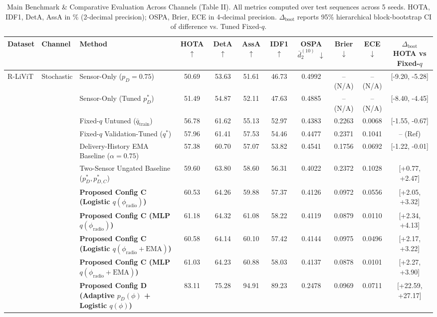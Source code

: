 \begin{table}[!t]
\caption{Main Benchmark & Comparative Evaluation Across Channels (Table II). All metrics computed over test sequences across 5 seeds. HOTA, IDF1, DetA, AssA in \% (2-decimal precision); OSPA, Brier, ECE in 4-decimal precision. $\Delta_{\text{boot}}$ reports 95\% hierarchical block-bootstrap CI of difference vs. Tuned Fixed-$q$.}
\label{tab:main_benchmark}
\centering
\scriptsize
\setlength{\tabcolsep}{3.5pt}
\begin{tabular}{lllcccccccc}
\toprule
Dataset & Channel & Method & HOTA $\uparrow$ & DetA $\uparrow$ & AssA $\uparrow$ & IDF1 $\uparrow$ & OSPA $\bar{d}_2^{(10)}$ $\downarrow$ & Brier $\downarrow$ & ECE $\downarrow$ & $\Delta_{\text{boot}}$ HOTA vs Fixed-$q$ \\
\midrule
R-LiViT & Stochastic & Sensor-Only ($p_D=0.75$) & 50.69 & 53.63 & 51.61 & 46.73 & 0.4992 & -- (N/A) & -- (N/A) & [-9.20, -5.28] \\
 &  & Sensor-Only (Tuned $p_D^*$) & 51.49 & 54.87 & 52.11 & 47.63 & 0.4885 & -- (N/A) & -- (N/A) & [-8.40, -4.45] \\
 &  & Fixed-$q$ Untuned ($\bar{q}_{\text{train}}$) & 56.78 & 61.62 & 55.13 & 52.97 & 0.4383 & 0.2263 & 0.0068 & [-1.55, -0.67] \\
 &  & Fixed-$q$ Validation-Tuned ($q^*$) & 57.96 & 61.41 & 57.53 & 54.46 & 0.4477 & 0.2371 & 0.1041 & -- (Ref) \\
 &  & Delivery-History EMA Baseline ($\alpha=0.75$) & 57.38 & 60.70 & 57.07 & 53.82 & 0.4541 & 0.1756 & 0.0692 & [-1.22, -0.01] \\
 &  & Two-Sensor Ungated Baseline ($p_D^*, p_{D,C}^*$) & 59.60 & 63.80 & 58.60 & 56.31 & 0.4022 & 0.2372 & 0.1028 & [+0.77, +2.47] \\
 &  & \textbf{Proposed Config C (Logistic $q(\phi_{\text{radio}})$)} & 60.53 & 64.26 & 59.88 & 57.37 & 0.4126 & 0.0972 & 0.0556 & [+2.05, +3.32] \\
 &  & \textbf{Proposed Config C (MLP $q(\phi_{\text{radio}})$)} & 61.18 & 64.32 & 61.08 & 58.22 & 0.4119 & 0.0879 & 0.0110 & [+2.34, +4.13] \\
 &  & \textbf{Proposed Config C (Logistic $q(\phi_{\text{radio}}+\text{EMA})$)} & 60.58 & 64.14 & 60.10 & 57.42 & 0.4144 & 0.0975 & 0.0496 & [+2.17, +3.22] \\
 &  & \textbf{Proposed Config C (MLP $q(\phi_{\text{radio}}+\text{EMA})$)} & 61.03 & 64.23 & 60.88 & 58.03 & 0.4137 & 0.0878 & 0.0101 & [+2.27, +3.90] \\
 &  & \textbf{Proposed Config D (Adaptive $p_D(\phi)$ + Logistic $q(\phi)$)} & 83.11 & 75.28 & 94.91 & 89.23 & 0.2478 & 0.0969 & 0.0711 & [+22.59, +27.17] \\

\end{tabular}
\end{table}
